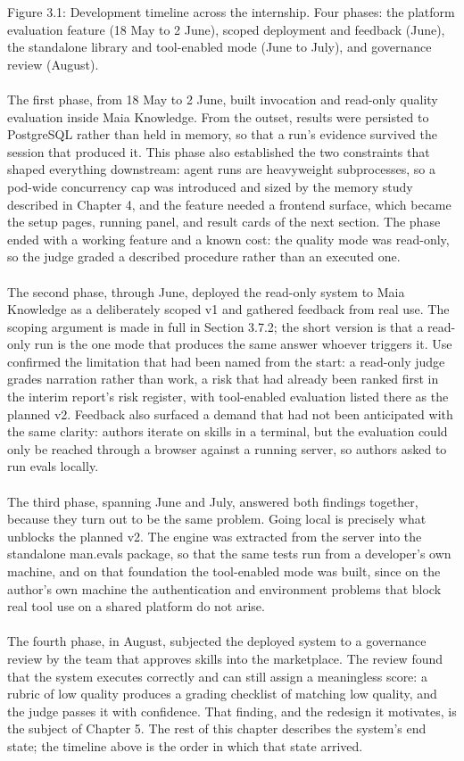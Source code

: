 Figure 3.1: Development timeline across the internship. Four phases: the platform evaluation feature (18 May to 2 June), scoped deployment and feedback (June), the standalone library and tool-enabled mode (June to July), and governance review (August).
\\\\
The first phase, from 18 May to 2 June, built invocation and read-only quality evaluation inside Maia Knowledge. From the outset, results were persisted to PostgreSQL rather than held in memory, so that a run's evidence survived the session that produced it. This phase also established the two constraints that shaped everything downstream: agent runs are heavyweight subprocesses, so a pod-wide concurrency cap was introduced and sized by the memory study described in Chapter 4, and the feature needed a frontend surface, which became the setup pages, running panel, and result cards of the next section. The phase ended with a working feature and a known cost: the quality mode was read-only, so the judge graded a described procedure rather than an executed one.
\\\\
The second phase, through June, deployed the read-only system to Maia Knowledge as a deliberately scoped v1 and gathered feedback from real use. The scoping argument is made in full in Section 3.7.2; the short version is that a read-only run is the one mode that produces the same answer whoever triggers it. Use confirmed the limitation that had been named from the start: a read-only judge grades narration rather than work, a risk that had already been ranked first in the interim report's risk register, with tool-enabled evaluation listed there as the planned v2. Feedback also surfaced a demand that had not been anticipated with the same clarity: authors iterate on skills in a terminal, but the evaluation could only be reached through a browser against a running server, so authors asked to run evals locally.
\\\\
The third phase, spanning June and July, answered both findings together, because they turn out to be the same problem. Going local is precisely what unblocks the planned v2. The engine was extracted from the server into the standalone man.evals package, so that the same tests run from a developer's own machine, and on that foundation the tool-enabled mode was built, since on the author's own machine the authentication and environment problems that block real tool use on a shared platform do not arise.
\\\\
The fourth phase, in August, subjected the deployed system to a governance review by the team that approves skills into the marketplace. The review found that the system executes correctly and can still assign a meaningless score: a rubric of low quality produces a grading checklist of matching low quality, and the judge passes it with confidence. That finding, and the redesign it motivates, is the subject of Chapter 5. The rest of this chapter describes the system's end state; the timeline above is the order in which that state arrived.


